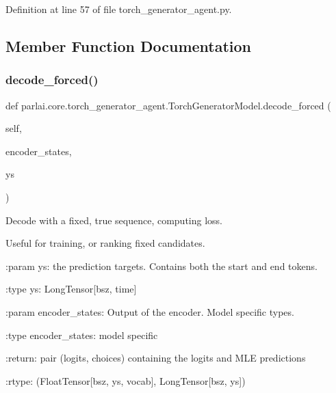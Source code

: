 Definition at line 57 of file torch\+\_\+generator\+\_\+agent.\+py.



\subsection{Member Function Documentation}
\mbox{\label{classparlai_1_1core_1_1torch__generator__agent_1_1TorchGeneratorModel_abfc801c11be6fc49dfbc4e70dc6b8ed9}} 
\subsubsection{\texorpdfstring{decode\+\_\+forced()}{decode\_forced()}}
{\footnotesize\ttfamily def parlai.\+core.\+torch\+\_\+generator\+\_\+agent.\+Torch\+Generator\+Model.\+decode\+\_\+forced (\begin{DoxyParamCaption}\item[{}]{self,  }\item[{}]{encoder\+\_\+states,  }\item[{}]{ys }\end{DoxyParamCaption})}

\begin{DoxyVerb}Decode with a fixed, true sequence, computing loss.

Useful for training, or ranking fixed candidates.

:param ys:
    the prediction targets. Contains both the start and end tokens.

:type ys:
    LongTensor[bsz, time]

:param encoder_states:
    Output of the encoder. Model specific types.

:type encoder_states:
    model specific

:return:
    pair (logits, choices) containing the logits and MLE predictions

:rtype:
    (FloatTensor[bsz, ys, vocab], LongTensor[bsz, ys])
\end{DoxyVerb}
 

